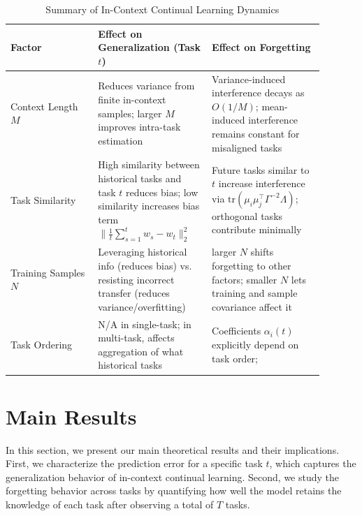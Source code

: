 \documentclass{article}
\theoremstyle{plain}
\theoremstyle{definition}
\theoremstyle{remark}
\begin{document}
\begin{table}[h]
\caption{Summary of In-Context Continual Learning Dynamics}
\label{T:iccl}
\vskip 0.1in
\begin{center}
	\begin{tabular}{p{0.25\linewidth} | p{0.32\linewidth} | p{0.32\linewidth}}
\toprule
\textbf{Factor} & \textbf{Effect on Generalization (Task $t$)} & \textbf{Effect on Forgetting} \\
\midrule
Context Length $M$ & Reduces variance from finite in-context samples; larger $M$ improves intra-task estimation & Variance-induced interference decays as $O(1/M)$; mean-induced interference remains constant for misaligned tasks\\
\hline
Task Similarity & High similarity between historical tasks and task $t$ reduces bias; low similarity increases bias term $\|\frac{1}{t}\sum_{s=1}^t w_s - w_t\|_2^2$ & Future tasks similar to $t$ increase interference via $\mathrm{tr}(\mu_i \mu_j^\top \Gamma^{-2} \Lambda)$; orthogonal tasks contribute minimally \\
\hline
Training Samples $N$ & Leveraging historical info (reduces bias) vs. resisting incorrect transfer (reduces variance/overfitting) & larger $N$ shifts forgetting to other factors; smaller $N$ lets training and sample covariance affect it \\
\hline
Task Ordering & N/A in single-task; in multi-task, affects aggregation of what historical tasks & Coefficients $\alpha_i(t)$ explicitly depend on task order; \\
\bottomrule
\end{tabular}\end{center}
\vskip -0.1in
\end{table}
\vspace{-0.1in}\section{Main Results}
\label{theory}
In this section, we present our main theoretical results and their implications. First, we characterize the prediction error for a specific task $t$, which captures the generalization behavior of in-context continual learning. Second, we study the forgetting behavior across tasks by quantifying how well the model retains the knowledge of each task after observing a total of $T$ tasks. 
\end{document}
